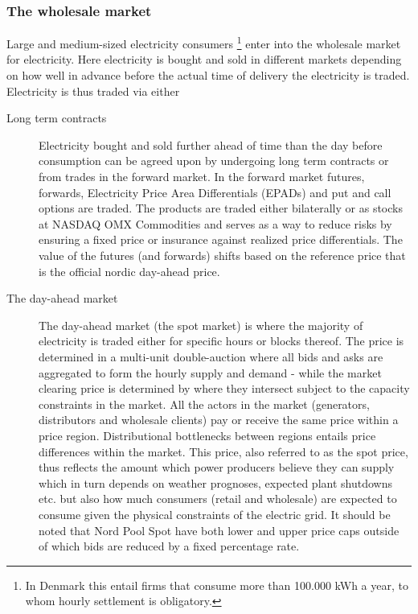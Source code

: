 \subsubsection{The wholesale market}
\label{subsubsec: t_whomarket}
Large and medium-sized electricity consumers \footnote{In Denmark this entail firms that consume more than 100.000 kWh  a year, to whom hourly settlement is obligatory.} enter into the wholesale market for electricity. Here electricity is bought and sold in different markets depending on how well in advance before the actual time of delivery the electricity is traded. Electricity is thus traded via either

\begin{description}

    \item [Long term contracts]
    Electricity bought and sold further ahead of time than the day before consumption can be agreed upon by undergoing long term contracts or from trades in the forward market. In the forward market futures, forwards, Electricity Price Area Differentials (EPADs) and put and call options are traded. The products are traded either bilaterally or as stocks at NASDAQ OMX Commodities and serves as a way to reduce risks by ensuring a fixed price or insurance against realized price differentials. The value of the futures (and forwards) shifts based on the reference price that is the official nordic day-ahead price.

    \item[The day-ahead market]
    The day-ahead market (the spot market) is where the majority of electricity is traded either for specific hours or blocks thereof. The price is determined in a multi-unit double-auction where all bids and asks are aggregated to form the hourly supply and demand - while the market clearing price is determined by where they intersect subject to the capacity constraints in the market. All the actors in the market (generators, distributors and wholesale clients) pay or receive the same price within a price region. Distributional bottlenecks between regions entails price differences within the market. This price, also referred to as the spot price, thus reflects the amount which power producers believe they can supply which in turn depends on weather prognoses, expected plant shutdowns etc. but also how much consumers (retail and wholesale) are expected to consume given the physical constraints of the electric grid. It should be noted that Nord Pool Spot have both lower and upper price caps outside of which bids are reduced by a fixed percentage rate.


\end{description}
